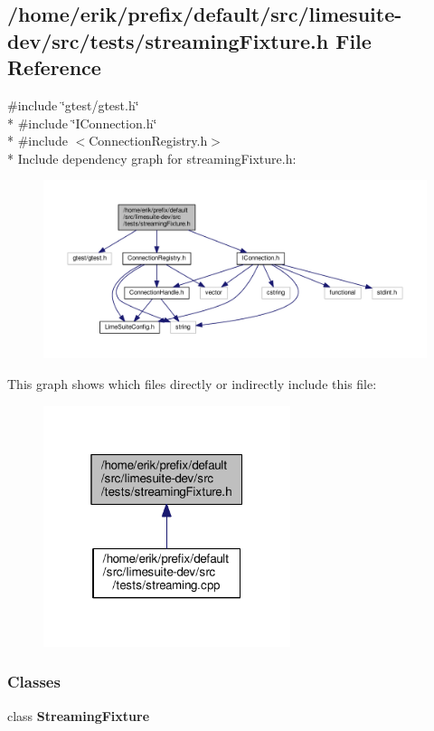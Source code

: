 \subsection{/home/erik/prefix/default/src/limesuite-\/dev/src/tests/streaming\+Fixture.h File Reference}
\label{streamingFixture_8h}
{\ttfamily \#include \char`\"{}gtest/gtest.\+h\char`\"{}}\\*
{\ttfamily \#include \char`\"{}I\+Connection.\+h\char`\"{}}\\*
{\ttfamily \#include $<$Connection\+Registry.\+h$>$}\\*
Include dependency graph for streaming\+Fixture.\+h\+:
\nopagebreak
\begin{figure}[H]
\begin{center}
\leavevmode
\includegraphics[width=350pt]{d5/d82/streamingFixture_8h__incl}
\end{center}
\end{figure}
This graph shows which files directly or indirectly include this file\+:
\nopagebreak
\begin{figure}[H]
\begin{center}
\leavevmode
\includegraphics[width=205pt]{d0/d99/streamingFixture_8h__dep__incl}
\end{center}
\end{figure}
\subsubsection*{Classes}
\begin{DoxyCompactItemize}
\item 
class {\bf Streaming\+Fixture}
\end{DoxyCompactItemize}
